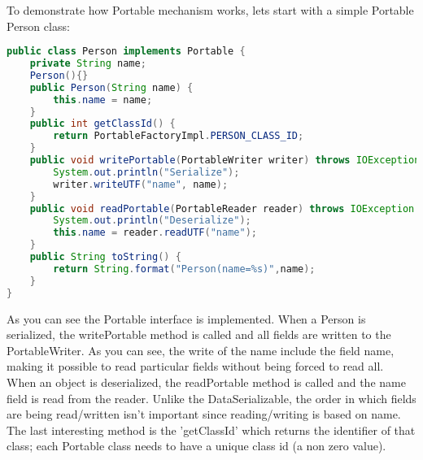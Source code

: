 To demonstrate how Portable mechanism works, lets start with a simple Portable Person class: 
\begin{lstlisting}[language=java]
public class Person implements Portable {
    private String name;
    Person(){}
    public Person(String name) {
        this.name = name;
    }
    public int getClassId() {
        return PortableFactoryImpl.PERSON_CLASS_ID;
    }
    public void writePortable(PortableWriter writer) throws IOException {
        System.out.println("Serialize");
        writer.writeUTF("name", name);
    }
    public void readPortable(PortableReader reader) throws IOException {
        System.out.println("Deserialize");
        this.name = reader.readUTF("name");
    }
    public String toString() {
        return String.format("Person(name=%s)",name);
    }
}
\end{lstlisting}
As you can see the Portable interface is implemented. When a Person is serialized, the writePortable method is called and all fields are written to the PortableWriter. As you can see, the write of the name include the field name, making it possible to read particular fields without being forced to read all. When an object is deserialized, the readPortable method is called and the name field is read from the reader. Unlike the DataSerializable, the order in which fields are being read/written isn't important since reading/writing is based  on name. The last interesting method is the 'getClassId' which returns the identifier of that class; each Portable class needs to have a unique class id (a non zero value).

